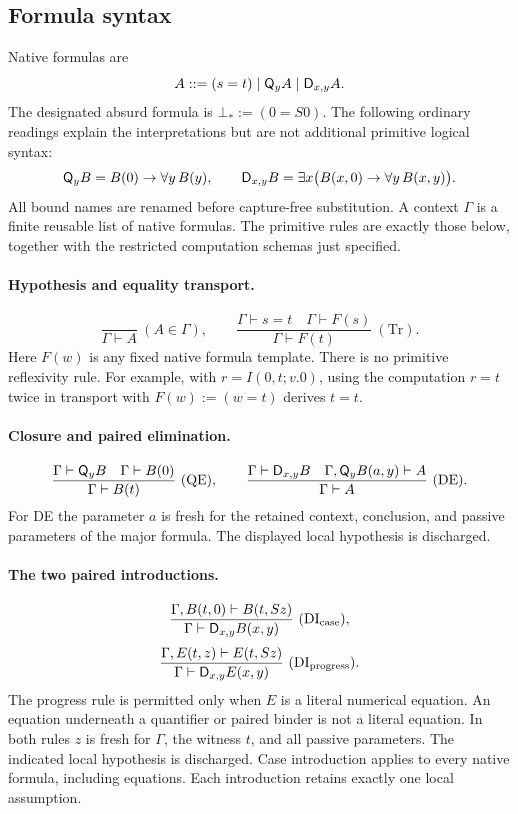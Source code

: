 \subsection{Formula syntax}

Native formulas are
\[
 A ::= (s=t)\mid \mathsf Q_y A\mid \mathsf D_{x,y}A.
\]
The designated absurd formula is $\bot_*:=(0=S0)$. The following ordinary
readings explain the interpretations but are not additional primitive
logical syntax:
\[
 \mathsf Q_y B = B(0)\to\forall y\,B(y),\qquad
 \mathsf D_{x,y}B=\exists x\bigl(B(x,0)\to\forall y\,B(x,y)\bigr).
\]
All bound names are renamed before capture-free substitution. A context
$\Gamma$ is a finite reusable list of native formulas. The primitive
rules are exactly those below, together with the restricted computation
schemas just specified.

\paragraph{Hypothesis and equality transport.}
\[
 \frac{}{\Gamma\vdash A}\ (A\in\Gamma),
 \qquad
 \frac{\Gamma\vdash s=t\quad\Gamma\vdash F(s)}
      {\Gamma\vdash F(t)}\ (\mathrm{Tr}).
\]
Here $F(w)$ is any fixed native formula template. There is no primitive
reflexivity rule. For example, with $r=I(0,t;v.0)$, using the computation
$r=t$ twice in transport with $F(w):=(w=t)$ derives $t=t$.

\paragraph{Closure and paired elimination.}
\[
 \frac{\Gamma\vdash\mathsf Q_y B\quad\Gamma\vdash B(0)}
      {\Gamma\vdash B(t)}\ (\mathrm{QE}),
 \qquad
 \frac{\Gamma\vdash\mathsf D_{x,y}B\quad
       \Gamma,\mathsf Q_yB(a,y)\vdash A}
      {\Gamma\vdash A}\ (\mathrm{DE}).
\]
For DE the parameter $a$ is fresh for the retained context, conclusion,
and passive parameters of the major formula. The displayed local
hypothesis is discharged.

\paragraph{The two paired introductions.}
\begin{gather*}
 \frac{\Gamma,B(t,0)\vdash B(t,Sz)}
      {\Gamma\vdash\mathsf D_{x,y}B(x,y)}\ (\mathrm{DI}_{\rm case}),\\[3pt]
 \frac{\Gamma,E(t,z)\vdash E(t,Sz)}
      {\Gamma\vdash\mathsf D_{x,y}E(x,y)}\ (\mathrm{DI}_{\rm progress}).
\end{gather*}
The progress rule is permitted only when $E$ is a literal numerical
equation. An equation underneath a quantifier or paired binder is not
a literal equation. In both rules $z$ is fresh for $\Gamma$, the witness
$t$, and all passive parameters. The indicated local hypothesis is
discharged. Case introduction applies to every native formula, including
equations. Each introduction retains exactly one local assumption.

